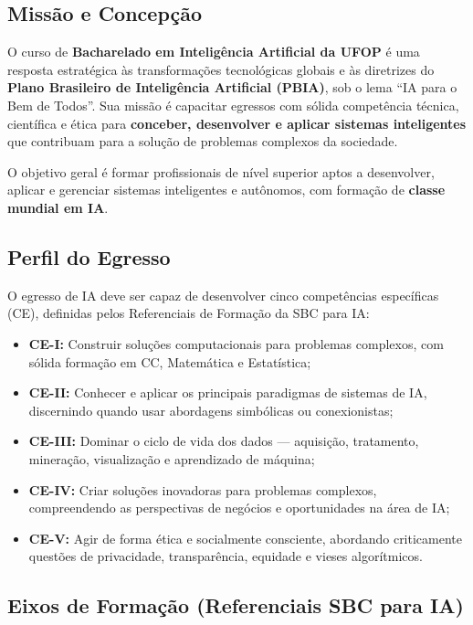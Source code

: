 \documentclass[9pt,a4paper]{extarticle}
\newcommand{\impt}[1]{\textcolor{important}{\textbf{#1}}}
\newcommand{\ia}[1]{\textcolor{iacolor}{\textbf{#1}}}
\begin{document}
\subsection{Missão e Concepção}

O curso de \ia{Bacharelado em Inteligência Artificial da UFOP} é uma resposta estratégica às transformações tecnológicas globais e às diretrizes do \textbf{Plano Brasileiro de Inteligência Artificial (PBIA)}, sob o lema \enquote{IA para o Bem de Todos}. Sua missão é capacitar egressos com sólida competência técnica, científica e ética para \impt{conceber, desenvolver e aplicar sistemas inteligentes} que contribuam para a solução de problemas complexos da sociedade.

O objetivo geral é formar profissionais de nível superior aptos a desenvolver, aplicar e gerenciar sistemas inteligentes e autônomos, com formação de \textbf{classe mundial em IA}.

\subsection{Perfil do Egresso}

O egresso de IA deve ser capaz de desenvolver cinco competências específicas (CE), definidas pelos Referenciais de Formação da SBC para IA:

\begin{itemize}
  \item \textbf{CE-I:} Construir soluções computacionais para problemas complexos, com sólida formação em CC, Matemática e Estatística;
  \item \textbf{CE-II:} Conhecer e aplicar os principais paradigmas de sistemas de IA, discernindo quando usar abordagens simbólicas ou conexionistas;
  \item \textbf{CE-III:} Dominar o ciclo de vida dos dados --- aquisição, tratamento, mineração, visualização e aprendizado de máquina;
  \item \textbf{CE-IV:} Criar soluções inovadoras para problemas complexos, compreendendo as perspectivas de negócios e oportunidades na área de IA;
  \item \textbf{CE-V:} Agir de forma ética e socialmente consciente, abordando criticamente questões de privacidade, transparência, equidade e vieses algorítmicos.
\end{itemize}

\subsection{Eixos de Formação (Referenciais SBC para IA)}
\end{document}
